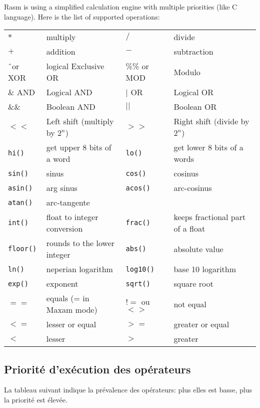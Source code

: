 \begin{xen}
Rasm is using a simplified calculation engine with multiple priorities (like C language). Here is the list of supported operations:

\begin{tabular}{ll|ll}
$*$ & multiply &
$/$ & divide \\
$+$ & addition &
$-$ & subtraction \\
\^\  or XOR & logical Exclusive OR &
\%\% or MOD & Modulo \\
\& AND & Logical AND &
$|$ OR & Logical OR \\
\&\& & Boolean AND &
$||$ & Boolean OR \\
$<<$ & Left shift (multiply by $2^n$) &
$>>$ & Right shift (divide by $2^n$) \\

\texttt{hi()} & get upper 8 bits of a word &
\texttt{lo()} & get lower 8 bits of a words \\

\texttt{sin()} & sinus &
\texttt{cos()} & cosinus \\
\texttt{asin()} & arg sinus &
\texttt{acos()} & arc-cosinus \\

\texttt{atan()} & arc-tangente &
& \\

\texttt{int()} & float to integer conversion &
\texttt{frac()} &  keeps fractional part of a float \\
\texttt{floor()} & rounds to the lower integer &
\texttt{abs()} & absolute value \\

\texttt{ln()} & neperian logarithm &
\texttt{log10()} & base 10 logarithm \\
\texttt{exp()} & exponent &
\texttt{sqrt()} & square root \\


$==$ & equals (= in Maxam mode) &
$!=$ ou $<>$ & not equal \\
$<=$ & lesser or equal &
$>=$ & greater or  equal \\
$<$ & lesser &
$>$ & greater \\

\end{tabular}

\end{xen}

\begin{xfr}
\subsection{Priorité d’exécution des opérateurs}
La tableau suivant indique la prévalence des opérateurs: plus elles est basse, plus la priorité est élevée.
\end{xfr}

